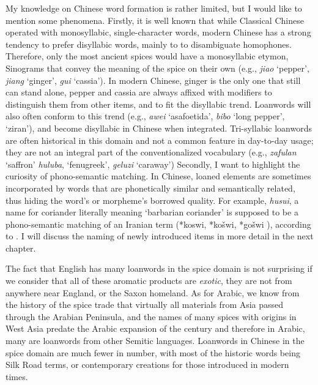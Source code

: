My knowledge on Chinese word formation is rather limited, but I would like to mention some phenomena. Firstly, it is well known that while Classical Chinese operated with monosyllabic, single-character words, modern Chinese has a strong tendency to prefer disyllabic words, mainly to to disambiguate homophones. Therefore, only the most ancient spices would have a monosyllabic etymon, Sinograms that convey the meaning of the spice on their own (e.g., \textit{jiao} `pepper', \textit{jiang} `ginger', \textit{gui} `cassia'). In modern Chinese, ginger is the only one that still can stand alone, pepper and cassia are always affixed with modifiers to distinguish them from other items, and to fit the disyllabic trend. Loanwords will also often conform to this trend (e.g., \textit{awei} `asafoetida', \textit{bibo} `long pepper', `ziran'), and become disyllabic in Chinese when integrated. Tri-syllabic loanwords are often historical in this domain and not a common feature in day-to-day usage; they are not an integral part of the conventionalized vocabulary (e.g., \textit{zafulan} `saffron' \textit{huluba}, `fenugreek', \textit{geluzi} `caraway')
Secondly, I want to highlight the curiosity of phono-semantic matching. In Chinese, loaned elements are sometimes incorporated by words that are phonetically similar and semantically related, thus hiding the word's or morpheme's borrowed quality. For example, \textit{husui}, a name for coriander literally meaning `barbarian coriander' is supposed to be a phono-semantic matching of an Iranian term (*koswi, *košwi, *gošwi
), according to \textcite{laufer_sino-iranica_1919}.  
I will discuss the naming of newly introduced items in more detail in the next chapter.

The fact that English has many loanwords in the spice domain is not surprising if we consider that all of these aromatic products are \emph{exotic}, they are not from anywhere near England, or the Saxon homeland. As for Arabic, we know from the history of the spice trade that virtually all materials from Asia passed through the Arabian Peninsula, and the names of many spices with origins in West Asia predate the Arabic expansion of the  century and therefore in Arabic, many are loanwords from other Semitic languages. Loanwords in Chinese in the spice domain are much fewer in number, with most of the historic words being Silk Road terms, or contemporary creations for those introduced in modern times. 

